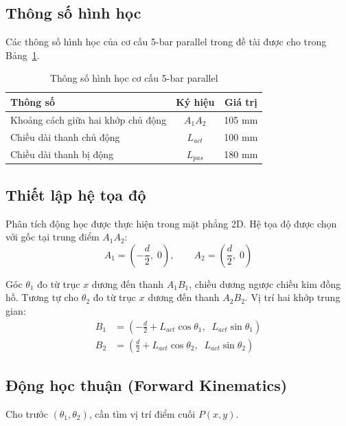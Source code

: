 \subsection{Thông số hình học}

Các thông số hình học của cơ cấu 5-bar parallel trong đề tài được cho trong
Bảng~\ref{tab:5bar_params}. 

\begin{table}[H]
\centering
\caption{Thông số hình học cơ cấu 5-bar parallel}
\label{tab:5bar_params}
\renewcommand{\arraystretch}{1.3}
\begin{tabular}{|l|c|c|}
\hline
\textbf{Thông số} & \textbf{Ký hiệu} & \textbf{Giá trị} \\
\hline
Khoảng cách giữa hai khớp chủ động & $A_1A_2$ & 105 mm \\
Chiều dài thanh chủ động & $L_{act}$ & 100 mm \\
Chiều dài thanh bị động  & $L_{pas}$ & 180 mm \\
\hline
\end{tabular}
\end{table}


\subsection{Thiết lập hệ tọa độ}

Phân tích động học được thực hiện trong mặt phẳng 2D. Hệ tọa độ được chọn với
gốc tại trung điểm $A_1A_2$:
\begin{equation}
    A_1 = \left(-\frac{d}{2},\; 0\right), \qquad A_2 = \left(\frac{d}{2},\; 0\right)
\end{equation}

Góc $\theta_1$ đo từ trục $x$ dương đến thanh $A_1B_1$, chiều dương ngược chiều
kim đồng hồ. Tương tự cho $\theta_2$ đo từ trục $x$ dương đến thanh $A_2B_2$.
Vị trí hai khớp trung gian:
\begin{align}
    B_1 &= \left(-\frac{d}{2} + L_{act}\cos\theta_1,\;\; L_{act}\sin\theta_1\right)
    \label{eq:B1}\\
    B_2 &= \left(\frac{d}{2} + L_{act}\cos\theta_2,\;\; L_{act}\sin\theta_2\right)
    \label{eq:B2}
\end{align}


\subsection{Động học thuận (Forward Kinematics)}

Cho trước $(\theta_1, \theta_2)$, cần tìm vị trí điểm cuối $P(x, y)$.

